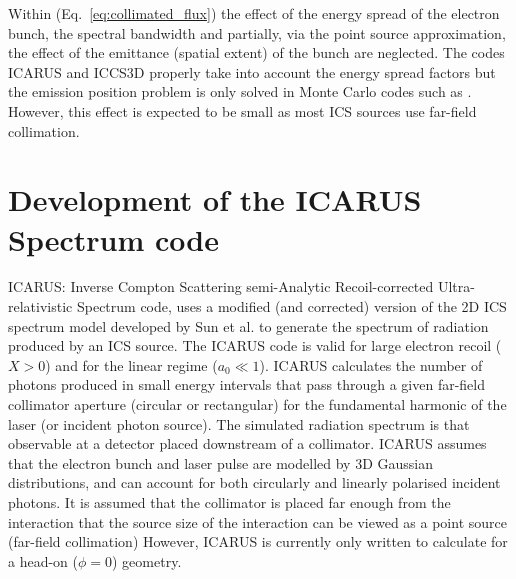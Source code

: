 \documentclass[../main.tex]{subfiles}
\begin{document}
Within (Eq.~\ref{eq:collimated_flux}) the effect of the energy spread of the electron bunch, the spectral bandwidth and partially, via the point source approximation, the effect of the emittance (spatial extent) of the bunch are neglected. The codes \textsc{ICARUS} and \textsc{ICCS3D} \cite{krafft2016laser,ranjan2018simulation} properly take into account the energy spread factors but the emission position problem is only solved in Monte Carlo codes such as  \cite{chen1995cain}. However, this effect is expected to be small as most ICS sources use far-field collimation.

\section{Development of the ICARUS Spectrum code}
\label{sec:development_of_the_ICARUS_spectrum_code}

\textsc{ICARUS}: Inverse Compton Scattering semi-Analytic Recoil-corrected Ultra-relativistic Spectrum code, uses a modified (and corrected) version of the 2D ICS spectrum model developed by Sun et al. \cite{sun2009characterizations,sun2011theoretical} to generate the spectrum of radiation produced by an ICS source. The \textsc{ICARUS} code is valid for large electron recoil ($X>0$) and for the linear regime ($a_{0}\ll 1$). \textsc{ICARUS} calculates the number of photons produced in small energy intervals that pass through a given far-field collimator aperture (circular or rectangular) for the fundamental harmonic of the laser (or incident photon source). The simulated radiation spectrum is that observable at a detector placed downstream of a collimator. \textsc{ICARUS} assumes that the electron bunch and laser pulse are modelled by 3D Gaussian distributions, and can account for both circularly and linearly polarised incident photons. It is assumed that the collimator is placed far enough from the interaction that the source size of the interaction can be viewed as a point source (far-field collimation) However, \textsc{ICARUS} is currently only written to calculate for a head-on ($\phi = 0$) geometry.
\end{document}
